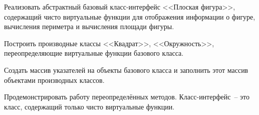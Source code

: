 Реализовать абстрактный базовый класс-интерфейс <<Плоская
фигура>>, содержащий чисто виртуальные функции для
отображения информации о фигуре, вычисления периметра и
вычисления площади фигуры.

Построить производные
классы <<Квадрат>>, <<Окружность>>, переопределяющие
виртуальные функции базового класса.

Создать массив
указателей на объекты базового класса и заполнить этот
массив объектами производных классов.

Продемонстрировать работу переопределённых методов.
Класс-интерфейс~-- это класс, содержащий только чисто
виртуальные функции.
